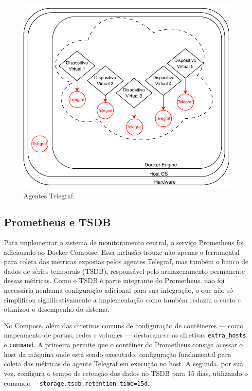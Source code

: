 \begin{figure}[H]
\centering
\includegraphics[scale=1]{Imagens/chap03/by-blocks/agents_diagram.pdf}
\caption{Agentes Telegraf.}
\label{fig:DiagramaAgentes}
\end{figure}


\subsection{Prometheus e TSDB}
\label{subsection:PrometheusTSDB}
Para implementar o sistema de monitoramento central, o serviço Prometheus foi adicionado ao Docker Compose. Essa inclusão trouxe não apenas o ferramental para coleta das métricas expostas pelos agentes Telegraf, mas também o banco de dados de séries temporais (TSDB), responsável pelo armazenamento permanente dessas métricas. Como o TSDB é parte integrante do Prometheus, não foi necessária nenhuma configuração adicional para sua integração, o que não só simplificou significativamente a implementação como também reduziu o custo e otimizou o desempenho do sistema.

No Compose, além das diretivas comuns de configuração de contêineres --- como mapeamento de portas, redes e volumes --- destacam-se as diretivas \verb|extra_hosts| e \verb|command|. A primeira permite que o contêiner do Prometheus consiga acessar o host da máquina onde está sendo executado, configuração fundamental para coleta das métricas do agente Telegraf em execução no host. A segunda, por sua vez, configura o tempo de retenção dos dados no TSDB para 15 dias, utilizando o comando \verb|--storage.tsdb.retention.time=15d|.

